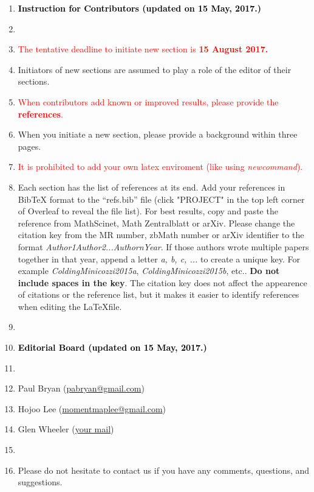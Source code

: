 \documentclass{amsart}
\theoremstyle{definition}
\begin{document}
\begin{enumerate}
\item[] \textbf{\textcolor{black}{Instruction for Contributors (updated on 15 May, 2017.)}}
\item[]
\item {\textcolor{red}{The tentative deadline to initiate new section is \textbf{15 August 2017.}}}
\item Initiators of new sections are assumed to play a role of the editor of their sections.
\item \textcolor{red}{When contributors add known or improved results, please provide the \textbf{references}.} 
\item When you initiate a new section, please provide a background within three pages. 
\item  {\textcolor{red}{It is prohibited to add your own latex enviroment (like using \textit{newcommand}).}} 
\item Each section has the list of references at its end. Add your references in BibTeX format to the ``refs.bib'' file (click "PROJECT" in the top left corner of Overleaf to reveal the file list). For best results, copy and paste the reference from MathScinet, Math Zentralblatt or arXiv. Please change the citation key from the MR number, zbMath number or arXiv identifier to the format \emph{Author1Author2...AuthornYear}. If those authors wrote multiple papers together in that year, append a letter \emph{a, b, c, ...} to create a unique key. For example \emph{ColdingMinicozzi2015a}, \emph{ColdingMinicozzi2015b}, etc.. \textbf{Do not include spaces in the key}. The citation key does not affect the appearence of citations or the reference list, but it makes it easier to identify references when editing the \LaTeX file.
\item[]
\item[] \textbf{\textcolor{black}{Editorial Board (updated on 15 May, 2017.)}}
\item[]
\item[] Paul Bryan  (\href{mailto:pabryan@gmail.com}{pabryan@gmail.com}) 
\item[] Hojoo Lee  (\href{mailto:momentmaplee@gmail.com}{momentmaplee@gmail.com}) 
\item[] Glen Wheeler  (\href{your mail}{your mail}) 
\item[]
\item[] Please do not hesitate to contact us if you have any comments, questions, and suggestions. 
\end{enumerate}
\end{document}
